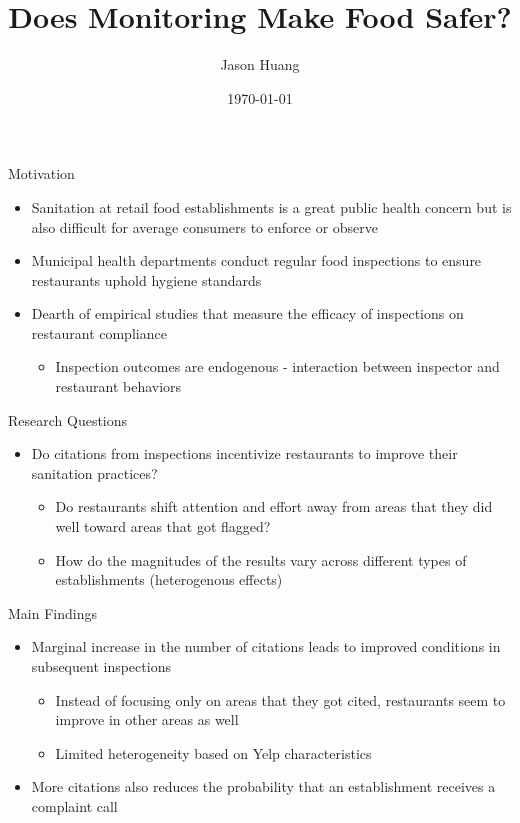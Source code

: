 \documentclass{beamer}
\title[Health Inspection]{Does Monitoring Make Food Safer?}
\subtitle{}
\author{Jason Huang}
\date{\today}
\begin{document}
\newcommand{\cfbox}[2]{%
    \colorlet{currentcolor}{.}%
    {\color{#1}%
    \fbox{\color{currentcolor}#2}}%
}
\begin{frame}
  \titlepage
\end{frame}

\begin{frame}{Motivation}
\begin{itemize}
    \item Sanitation at retail food establishments is a great public health concern but is also difficult for average consumers to enforce or observe
    \pause
    \item Municipal health departments conduct regular food inspections to ensure restaurants uphold hygiene standards
    \pause 
    \item Dearth of empirical studies that measure the efficacy of inspections on restaurant compliance
    \begin{itemize}
    \item Inspection outcomes are endogenous - interaction between inspector and restaurant behaviors
    \end{itemize}
    \end{itemize}
\end{frame}

\begin{frame}{Research Questions}
\pause
\begin{itemize}
\item Do citations from inspections incentivize restaurants to improve their sanitation practices?
\begin{itemize}
\item Do restaurants shift attention and effort away from areas that they did well toward areas that got flagged?
\item How do the magnitudes of the results vary across different types of establishments (heterogenous effects)
\end{itemize}
\end{itemize}
\end{frame}

\begin{frame}{Main Findings}
\begin{itemize}
\item Marginal increase in the number of citations leads to improved conditions in subsequent inspections
\begin{itemize}
\item Instead of focusing only on areas that they got cited, restaurants seem to improve in other areas as well
\item Limited heterogeneity based on Yelp characteristics
\end{itemize}
\item More citations also reduces the probability that an establishment receives a complaint call
\end{itemize}
\end{frame}
\end{document}
